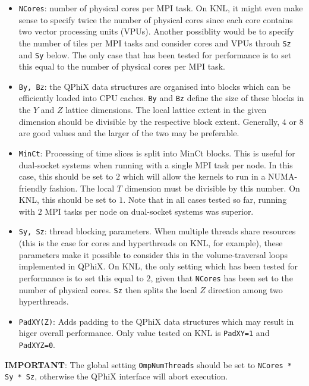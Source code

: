 \begin{itemize}
  \item{\texttt{NCores}: number of physical cores per MPI task. On KNL, it might even make sense to specify twice the number of physical cores since each core contains two vector processing units (VPUs). Another possiblity would be to specify the number of tiles per MPI tasks and consider cores and VPUs throuh \texttt{Sz} and \texttt{Sy} below. The only case that has been tested for performance is to set this equal to the number of physical cores per MPI task.}
  \item{\texttt{By, Bz}: the QPhiX data structures are organised into blocks which can be efficiently loaded into CPU caches. \texttt{By} and \texttt{Bz} define the size of these blocks in the $Y$ and $Z$ lattice dimensions. The local lattice extent in the given dimension should be divisible by the respective block extent. Generally, $4$ or $8$ are good values and the larger of the two may be preferable.}
  \item{\texttt{MinCt}: Processing of time slices is split into MinCt blocks. This is useful for dual-socket systems when running with a single MPI task per node. In this case, this should be set to $2$ which will allow the kernels to run in a NUMA-friendly fashion. The local $T$ dimension must be divisible by this number. On KNL, this should be set to $1$. Note that in all cases tested so far, running with $2$ MPI tasks per node on dual-socket systems was superior.}
  \item{\texttt{Sy, Sz}: thread blocking parameters. When multiple threads share resources (this is the case for cores and hyperthreads on KNL, for example), these parameters make it possible to consider this in the volume-traversal loops implemented in QPhiX. On KNL, the only setting which has been tested for performance is to set this equal to $2$, given that \texttt{NCores} has been set to the number of physical cores. \texttt{Sz} then splits the local $Z$ direction among two hyperthreads.}
  \item{\texttt{PadXY(Z)}: Adds padding to the QPhiX data structures which may result in higer overall performance. Only value tested on KNL is \texttt{PadXY=1} and \texttt{PadXYZ=0}.}
\end{itemize}

\noindent\textbf{IMPORTANT}: The global setting \texttt{OmpNumThreads} should be set to \texttt{NCores * Sy * Sz}, otherwise the QPhiX interface will abort execution.

